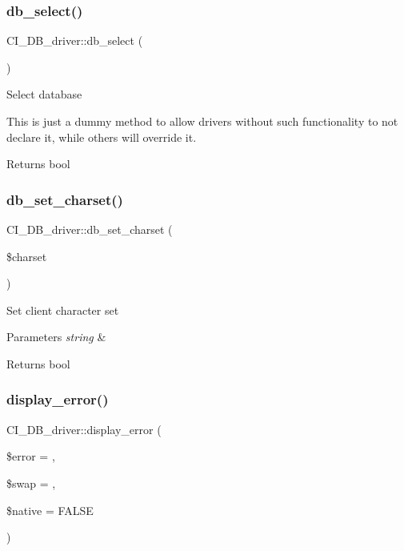 \subsubsection{\texorpdfstring{db\+\_\+select()}{db\_select()}}
{\footnotesize\ttfamily C\+I\+\_\+\+D\+B\+\_\+driver\+::db\+\_\+select (\begin{DoxyParamCaption}{ }\end{DoxyParamCaption})}

Select database

This is just a dummy method to allow drivers without such functionality to not declare it, while others will override it.

\begin{DoxyReturn}{Returns}
bool 
\end{DoxyReturn}
\mbox{\label{class_c_i___d_b__driver_ad0748b50ca688b84f2b8404bec53965a}} 
\subsubsection{\texorpdfstring{db\+\_\+set\+\_\+charset()}{db\_set\_charset()}}
{\footnotesize\ttfamily C\+I\+\_\+\+D\+B\+\_\+driver\+::db\+\_\+set\+\_\+charset (\begin{DoxyParamCaption}\item[{}]{\$charset }\end{DoxyParamCaption})}

Set client character set


\begin{DoxyParams}{Parameters}
{\em string} & \\
\hline
\end{DoxyParams}
\begin{DoxyReturn}{Returns}
bool 
\end{DoxyReturn}
\mbox{\label{class_c_i___d_b__driver_ae75ae91c317477f106ebb05bfca996b1}} 
\subsubsection{\texorpdfstring{display\+\_\+error()}{display\_error()}}
{\footnotesize\ttfamily C\+I\+\_\+\+D\+B\+\_\+driver\+::display\+\_\+error (\begin{DoxyParamCaption}\item[{}]{\$error = {\ttfamily \textquotesingle{}\textquotesingle{}},  }\item[{}]{\$swap = {\ttfamily \textquotesingle{}\textquotesingle{}},  }\item[{}]{\$native = {\ttfamily FALSE} }\end{DoxyParamCaption})}

